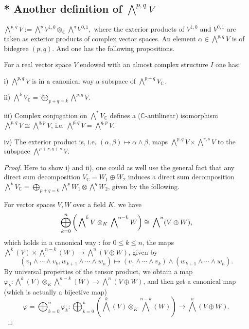 \documentclass{ctexart}
\begin{document}
\subsection*{* Another definition of $\bigwedge^{p, q} V$}

$\bigwedge^{p, q} V:=\bigwedge^p V^{1,0} \otimes_\mathbb{C} \bigwedge^q V^{0,1},$ where the exterior products of 
$V^{1,0}$ and $V^{0,1}$ are taken as exterior products of complex vector spaces. An element $\alpha \in \bigwedge^{p, q} V$ is of bidegree $(p, q)$. And one has the following propositions.

\begin{proposition}
  For a real vector space $V$ endowed with an almost complex structure $I$ one has:

  i) $\bigwedge^{p, q} V$ is in a canonical way a subspace of $\bigwedge^{p+q} V_{\mathbb{C}}$.

  ii) $\bigwedge^{k} V_{\mathbb{C}}=\bigoplus_{p+q=k} \bigwedge^{p, q} V$.

  iii) Complex conjugation on $\bigwedge^{*} V_{\mathbb{C}}$ defines a ($\mathbb{C}$-antilinear) isomorphism $\bigwedge^{p, q} V \cong \bigwedge^{q, p} V$, 
  i.e. $\overline{\bigwedge^{p, q} V}=\bigwedge^{q, p} V$.

  iv) The exterior product is, i.e. $(\alpha, \beta) \mapsto \alpha \wedge \beta$, maps $\bigwedge^{p, q} V \times \bigwedge^{r, s} V$ to the subspace $\bigwedge^{p+r, q+s} V$.
\end{proposition}
\begin{proof}[Proof]
  Here to show i) and ii), one could as well use the general fact that any direct sum decomposition $V_{\mathbb{C}}=W_{1} \oplus W_{2}$ induces 
  a direct sum decomposition $\bigwedge^{k} V_{\mathbb{C}}=\bigoplus_{p+q=k} \bigwedge^{p} W_{1} \otimes \bigwedge^{q} W_{2}$, given by the following.

  For vector spaces $V, W$ over a field $K$, we have
  $$
  \bigoplus_{k=0}^{n}\left(\sideset{}{^{k}}\bigwedge V \otimes_{K} \sideset{}{^{n-k}}\bigwedge W \right) \cong \sideset{}{^{n}}\bigwedge(V \oplus W), 
  $$
  which holds in a canonical way : for $0 \leq k \leq n$, the maps $\bigwedge^{k}(V) \times \bigwedge^{n-k}(W) \rightarrow \bigwedge^{n}(V \oplus W)$, given by 
  $$
  \left(v_{1} \wedge \cdots \wedge v_{k}, w_{k+1} \wedge \cdots \wedge w_{n}\right) \mapsto\left(v_{1} \wedge \cdots \wedge v_{k}\right) \wedge\left(w_{k+1} \wedge \cdots \wedge w_{n}\right).
  $$
  By universal properties of the tensor product, we obtain a map $\varphi_{k}: \bigwedge^{k}(V) \otimes_{K} \bigwedge^{n-k}(W) \rightarrow \bigwedge^{n}(V \oplus W)$, 
  and then get a canonical map (which is actually a bijective map)
  $$
  \varphi=\bigoplus_{k=0}^{n} \varphi_{k}: \bigoplus_{k=0}^{n}\left(\bigwedge^{k}(V) \otimes_{K} \bigwedge^{n-k}(W)\right) \longrightarrow \bigwedge^{n}(V \oplus W). 
  $$
\end{proof}
\end{document}
